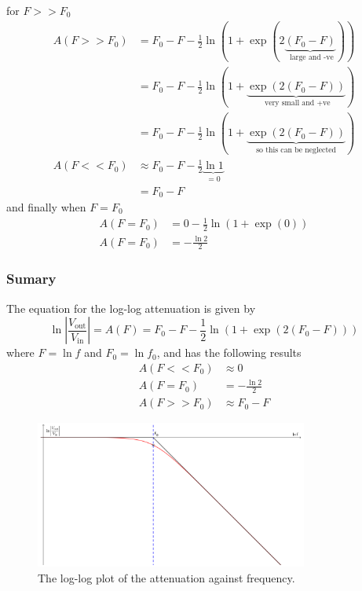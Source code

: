 for $F>>F_0$
\begin{align}
  A(F>>F_0) &= F_0 - F  -\frac{1}{2} \ln\left(1+\exp(2\underbrace{(F_0 - F)}_{\text{ large and -ve}})\right) \nonumber \\
  &= F_0 - F  -\frac{1}{2} \ln\left(1+\underbrace{\exp(2(F_0 - F))}_{\text{ very small and +ve}}\right) \nonumber \\
  &= F_0 - F  -\frac{1}{2} \ln\left(1+\underbrace{\exp(2(F_0 - F))}_{\text{so this can be neglected}}\right) \nonumber \\
  A(F<<F_0) &\approx F_0 - F  -\frac{1}{2} \underbrace{\ln 1}_{=0} \nonumber \\
  &= F_0 - F \label{eq:RC_log_log_large_F}
\end{align}
and finally when $F=F_0$
\begin{align}
  A(F=F_0) &=  0 -\frac{1}{2} \ln\left(1+\exp(0)\right) \nonumber \\
  A(F=F_0) &= -\frac{\ln 2}{2} \label{eq:RC_log_log_equal}
\end{align}

\begin{framed}
\subsubsection*{Sumary}
The equation for the log-log attenuation is given by
\begin{equation*}
\ln \left|\frac{V_{\text{out}}}{V_{\text{in}}} \right| = A(F) = F_0 - F  -\frac{1}{2} \ln\left(1+\exp(2(F_0 - F))\right)
\end{equation*}
where $F=\ln f$ and $F_0 = \ln f_0$, and has the following results
\begin{align*}
   A(F<<F_0) &\approx 0 \\
   A(F=F_0) &= -\frac{\ln 2}{2} \\
   A(F>>F_0) &\approx F_0 - F
\end{align*}
\end{framed}
\begin{figure}[h]
  \centering
\includegraphics[width=0.8\textwidth]{img/RC_log_log_plot2}
\caption{The log-log plot of the attenuation against frequency.} \label{fig:RC_log_log}
\end{figure}
